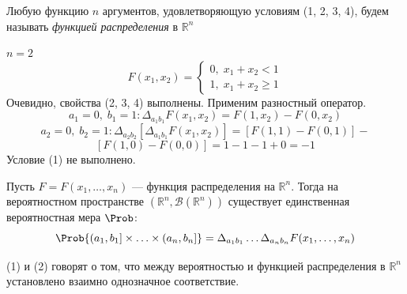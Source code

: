 \begin{definition}
	Любую функцию $n$ аргументов, удовлетворяющую условиям (1, 2, 3, 4), будем называть \textit{функцией распределения} в $\mathbb{R}^n$
\end{definition}
\begin{example}
	$n = 2$ \\
	\[
		F(x_1, x_2) =
		\begin{cases}
			0, \; x_1 + x_2 < 1 \\
			1, \; x_1 + x_2 \geqslant 1
		\end{cases}
	\]
	Очевидно, свойства (2, 3, 4) выполнены. Применим разностный оператор.
	\[
		a_1 = 0, \; b_1 = 1 : \Delta_{a_1 b_1} F(x_1, x_2) = F(1,x_2) - F(0, x_2)
	\]
	\[ a_2 = 0, \; b_2 = 1 : \Delta_{a_2 b_2} [\Delta_{a_1 b_1} F(x_1, x_2)] = [F(1,1) - F(0, 1)] - \]
	\[ [F(1,0) - F(0,0)] = 1 - 1 - 1 + 0 = -1 \]
	Условие (1) не выполнено.
\end{example}
\begin{theorem}
	Пусть $F = F(x_1, \ldots, x_n)$ --- функция распределения на $\mathbb{R}^n$. Тогда на вероятностном пространстве $(\mathbb{R}^n, \mathcal{B}(\mathbb{R}^n))$ существует единственная вероятностная мера $\Prob$:
	\begin{equation}
		\Prob \{ (a_1, b_1] \times \ldots \times (a_n, b_n] \} = \Delta_{a_1 b_1} \dots \Delta_{a_n b_n} F(x_1, \ldots, x_n)
	\end{equation}
\end{theorem}
(1) и (2) говорят о том, что между вероятностью и функцией распределения в $\mathbb{R}^n$ установлено взаимно однозначное соответствие.

